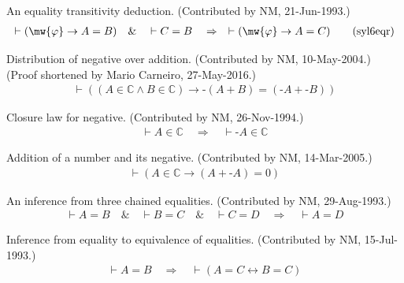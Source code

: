 \begin{lemma} An equality transitivity deduction. 
(Contributed by NM,
       21-Jun-1993.)
\begin{align}
\vdash ( \mw{\varphi} \rightarrow A = B )\quad\&\quad \vdash C =
    B\quad\Rightarrow\quad \vdash ( \mw{\varphi} \rightarrow A = C
    )\label{eq:syl6eqr}\tag{syl6eqr}
\end{align}
\end{lemma}


\begin{lemma} Distribution of negative over addition. 
(Contributed by NM, 10-May-2004.)
     (Proof shortened by Mario Carneiro, 27-May-2016.)
\begin{align}
\vdash ( ( A \in \mathbb{C} \wedge B \in \mathbb{C} ) \rightarrow \textrm{-} (
    A + B ) = ( \textrm{-} A + \textrm{-} B ) )\label{eq:negdi}\tag{negdi}
\end{align}
\end{lemma}


\begin{lemma} Closure law for negative.  (Contributed by
NM, 26-Nov-1994.)
\begin{align}
\vdash A \in \mathbb{C}\quad\Rightarrow\quad \vdash \textrm{-} A \in
    \mathbb{C}\label{eq:negcli}\tag{negcli}
\end{align}
\end{lemma}


\begin{lemma} Addition of a number and its negative. 
(Contributed by NM,
     14-Mar-2005.)
\begin{align}
\vdash ( A \in \mathbb{C} \rightarrow ( A + \textrm{-} A ) = 0
    )\label{eq:negid}\tag{negid}
\end{align}
\end{lemma}


\begin{lemma} An inference from three chained equalities. 
(Contributed by NM,
       29-Aug-1993.)
\begin{align}
\vdash A = B\quad\&\quad \vdash B = C\quad\&\quad \vdash C =
    D\quad\Rightarrow\quad \vdash A = D\label{eq:3eqtri}\tag{3eqtri}
\end{align}
\end{lemma}


\begin{lemma} Inference from equality to equivalence of
equalities.  (Contributed by
       NM, 15-Jul-1993.)
\begin{align}
\vdash A = B\quad\Rightarrow\quad \vdash ( A = C \leftrightarrow B = C
    )\label{eq:eqeq1i}\tag{eqeq1i}
\end{align}
\end{lemma}


